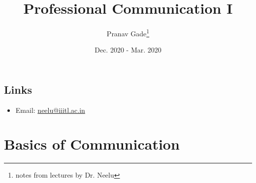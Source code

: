 \documentclass[10pt, a4paper]{report}
\author{Pranav Gade\thanks{notes from lectures by Dr. Neelu}}
\date{Dec. 2020 - Mar. 2020}
\title{Professional Communication I}
\begin{document}
	\maketitle
	\section*{Links}
	\begin{itemize}
		\item Email: \href{mailto:neelu@iiitl.ac.in}{neelu@iiitl.ac.in}
	\end{itemize}
	\newpage
	
	\chapter{Basics of Communication}
		
\end{document}
